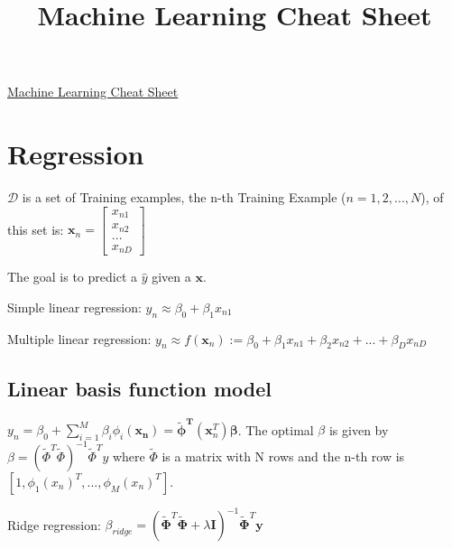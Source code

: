 \documentclass[10pt,a4paper,landscape]{article}
\begin{document}
\title{Machine Learning Cheat Sheet}

\raggedright
\footnotesize
\sffamily
\begin{multicols*}{4}

\setlength{\premulticols}{1pt}
\setlength{\postmulticols}{1pt}
\setlength{\multicolsep}{1pt}
\setlength{\columnsep}{2pt}

\begin{center}
  \Large{\underline{Machine Learning Cheat Sheet}}
\end{center}

\section{Regression}
  $\mathcal{D}$ is a set of Training examples, the n-th Training Example ($n = 1,2, ..., N$), of this set is: $\mathbf{x}_n = \begin{bmatrix} x_{n1} \\ x_{n2} \\ ... \\ x_{nD} \end{bmatrix} $

  The goal is to predict a $\hat{y}$ given a $\mathbf{x}$.

  Simple linear regression: $y_n \approx \beta_0 + \beta_1 x_{n1}$

  Multiple linear regression: $y_n \approx f(\mathbf{x}_n) := \beta_0 + \beta_1 x_{n1} + \beta_2 x_{n2} + ... + \beta_D x_{nD}$

  \subsection{Linear basis function model}
  $y_n = \beta_0 + \sum_{i=1}^{M} \beta_i \phi_i(\mathbf{x_n}) =  \mathbf{\tilde\phi^T}(\mathbf{x}^T_n) \boldsymbol\beta$.
  The optimal $\beta$ is given by $\beta = ( \tilde{\Phi}^T \tilde{\Phi})^{-1} \tilde{\Phi}^T y$ where $\tilde{\Phi}$ is a matrix with N rows and the n-th row is $[1, \phi_1(x_n)^T,  ...,  \phi_M(x_n)^T]$.

  Ridge regression: $\beta_{ridge} = ( \tilde{\boldsymbol \Phi}^T \tilde{\boldsymbol\Phi} + \lambda \boldsymbol I)^{-1} \tilde{\boldsymbol\Phi}^T \boldsymbol y$


\end{multicols*}
\end{document}
